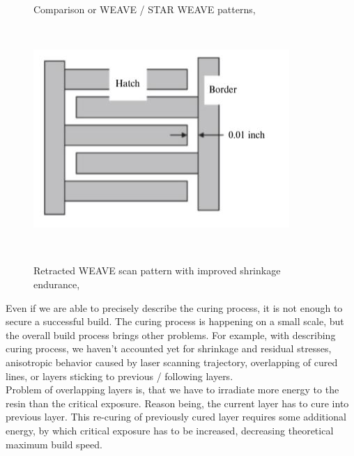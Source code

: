 \documentclass[a4paper, twoside, 11pt]{report}
\begin{document}
\begin{figure}[!t]
\begin{minipage}[t]{0.45\textwidth}
    \caption{Comparison or WEAVE / STAR WEAVE patterns, \cite[p. 88]{AMT}}
  \end{minipage}
  \\[10pt]
  \begin{minipage}[t]{\textwidth}
  \centering
  \includegraphics[scale=0.8]{retractedWeave}
  \caption{Retracted WEAVE scan pattern with improved shrinkage endurance, \cite[p. 90]{AMT}}
  \end{minipage}
  \\[20pt]
\end{figure}
%
Even if we are able to precisely describe the curing process, it is not enough to secure a successful build. The curing process is happening on a small scale, but the overall build process brings other problems. For example, with describing curing process, we haven't accounted yet for shrinkage and residual stresses, anisotropic behavior caused by laser scanning trajectory, overlapping of cured lines, or layers sticking to previous / following layers.\\
Problem of overlapping layers is, that we have to irradiate more energy to the resin than the critical exposure. Reason being, the current layer has to cure into previous layer. This re-curing of previously cured layer requires some additional energy, by which critical exposure has to be increased, decreasing theoretical maximum build speed.\\
\end{document}
